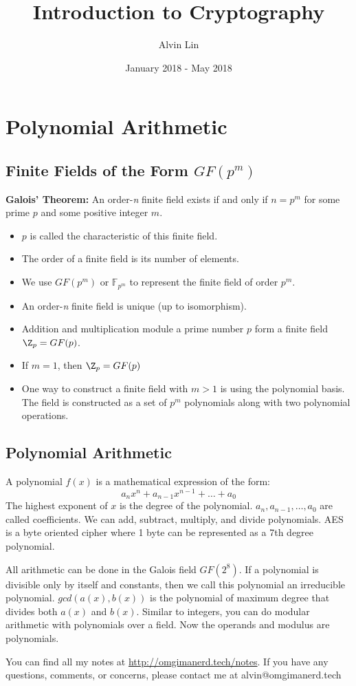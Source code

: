 \documentclass{math}
\title{Introduction to Cryptography}
\author{Alvin Lin}
\date{January 2018 - May 2018}
\begin{document}
\maketitle

\section*{Polynomial Arithmetic}

\subsection*{Finite Fields of the Form \( GF(p^m) \)}
\textbf{Galois' Theorem:} An order-\textit{n} finite field exists if and only if
\( n = p^m \) for some prime \( p \) and some positive integer \( m \).
\begin{itemize}
  \item \( p \) is called the characteristic of this finite field.
  \item The order of a finite field is its number of elements.
  \item We use \( GF(p^m) \) or \( \mathbb{F}_{p^m} \) to represent the finite
  field of order \( p^m \).
  \item An order-\textit{n} finite field is unique (up to isomorphism).
  \item Addition and multiplication module a prime number \( p \) form a finite
  field \( \Z_p = GF(p) \).
  \item If \( m = 1 \), then \( \Z_p = GF(p) \)
  \item One way to construct a finite field with \( m > 1 \) is using the
  polynomial basis. The field is constructed as a set of \( p^m \) polynomials
  along with two polynomial operations.
\end{itemize}

\subsection*{Polynomial Arithmetic}
A polynomial \( f(x) \) is a mathematical expression of the form:
\[ a_nx^n+a_{n-1}x^{n-1}+\dots+a_0 \]
The highest exponent of \( x \) is the degree of the polynomial. \( a_n,
a_{n-1}, \dots, a_0 \) are called coefficients. We can add, subtract, multiply,
and divide polynomials. AES is a byte oriented cipher where 1 byte can be
represented as a 7th degree polynomial.
\par All arithmetic can be done in the Galois field \( GF(2^8) \). If a
polynomial is divisible only by itself and constants, then we call this
polynomial an irreducible polynomial. \( gcd(a(x), b(x)) \) is the polynomial
of maximum degree that divides both \( a(x) \) and \( b(x) \). Similar to
integers, you can do modular arithmetic with polynomials over a field. Now the
operands and modulus are polynomials.

\begin{center}
  You can find all my notes at \url{http://omgimanerd.tech/notes}. If you have
  any questions, comments, or concerns, please contact me at
  alvin@omgimanerd.tech
\end{center}
\end{document}
